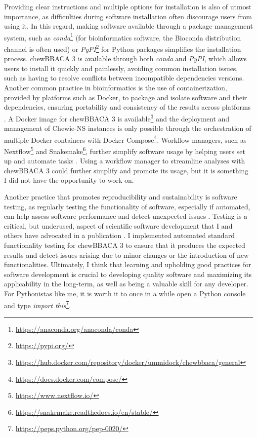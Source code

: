 Providing clear instructions and multiple options for installation is also of utmost importance, as difficulties during software installation often discourage users from using it. In this regard, making software available through a package management system, such as \textit{conda}\footnote{\url{https://anaconda.org/anaconda/conda}} (for bioinformatics software, the Bioconda distribution channel \cite{gruning_bioconda_2018} is often used) or \textit{PyPI}\footnote{\url{https://pypi.org/}} for Python packages simplifies the installation process. chewBBACA 3 is available through both \textit{conda} and \textit{PyPI}, which allows users to install it quickly and painlessly, avoiding common installation issues, such as having to resolve conflicts between incompatible dependencies versions. Another common practice in bioinformatics is the use of containerization, provided by platforms such as Docker, to package and isolate software and their dependencies, ensuring portability and consistency of the results across platforms \cite{gruening_recommendations_2018, nust_ten_2020}. A Docker image for chewBBACA 3 is available\footnote{\url{https://hub.docker.com/repository/docker/ummidock/chewbbaca/general}} and the deployment and management of Chewie-NS instances is only possible through the orchestration of multiple Docker containers with Docker Compose\footnote{\url{https://docs.docker.com/compose/}}. Workflow managers, such as Nextflow\footnote{\url{https://www.nextflow.io/}} and Snakemake\footnote{\url{https://snakemake.readthedocs.io/en/stable/}}, further simplify software usage by helping users set up and automate tasks \cite{wratten_reproducible_2021, strozzi_scalable_2019}. Using a workflow manager to streamline analyses with chewBBACA 3 could further simplify and promote its usage, but it is something I did not have the opportunity to work on.

Another practice that promotes reproducibility and sustainability is software testing, as regularly testing the functionality of software, especially if automated, can help assess software performance and detect unexpected issues \cite{krafczyk_scientific_2019}. Testing is a critical, but underused, aspect of scientific software development that I and others have advocated in a publication \cite{van_der_putten_software_2022}. I implemented automated standard functionality testing for chewBBACA 3 to ensure that it produces the expected results and detect issues arising due to minor changes or the introduction of new functionalities. Ultimately, I think that learning and upholding good practices for software development is crucial to developing quality software and maximizing its applicability in the long-term, as well as being a valuable skill for any developer. For Pythonistas like me, it is worth it to once in a while open a Python console and type \textit{import this}\footnote{\url{https://peps.python.org/pep-0020/}}.

